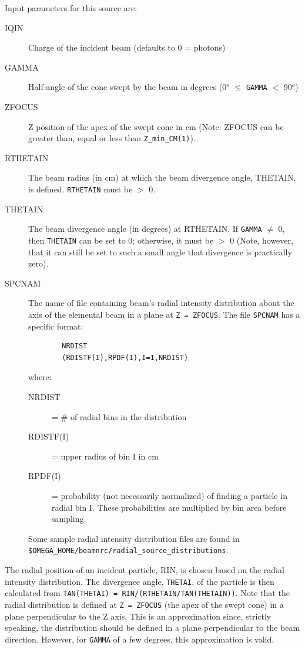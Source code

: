 \documentclass[12pt,twoside]{article}
\begin{document}
Input parameters for this source are:
\vspace{-3mm}
\begin{description}
\item [IQIN] Charge of the incident beam (defaults to 0 = photons)
\item [GAMMA] Half-angle of the cone swept by the beam in degrees (0$^o$ $\leq$
\verb+GAMMA+ $<$ 90$^o$)
\item [ZFOCUS] Z position of the apex of the swept cone in cm (Note: ZFOCUS can
be greater than, equal or less than {\tt Z\_min\_CM(1)}).
\item [RTHETAIN] The beam radius (in cm)
at which the beam divergence angle, THETAIN, is
defined. {\tt RTHETAIN} must be $>$ 0.
\item [THETAIN] The beam divergence angle (in degrees) at RTHETAIN.  If
{\tt GAMMA} $\neq$ 0, then {\tt THETAIN} can be set to 0; otherwise, it
must be $>$ 0 (Note, however, that it can still be set to such a small
angle that divergence is practically zero).
\item [SPCNAM] The name of file containing beam's radial intensity
distribution about the axis of the elemental beam in a plane at {\tt Z =
ZFOCUS}.
The file \verb+SPCNAM+ has a specific format:
\vspace{-5mm}
\begin{verbatim}
        NRDIST
        (RDISTF(I),RPDF(I),I=1,NRDIST)
\end{verbatim}
\vspace{-5mm}
where:
\begin{description}
\item [NRDIST] = \# of radial bins in the distribution
\item [RDISTF(I)] = upper radius of bin I in cm
\item [RPDF(I)] = probability (not necessarily normalized) of finding a
                  particle in radial bin I.  These probabilities are multiplied
                  by bin area before sampling.
\end{description}
Some sample radial intensity distribution files are found in {\tt \$OMEGA\_HOME/beamnrc/radial\_source\_distributions}.
\end{description}
The radial position of an incident particle, RIN, is chosen based on
the radial intensity distribution.  The divergence angle, {\tt THETAI}, of the
particle is then
calculated from {\tt TAN(THETAI) = RIN/(RTHETAIN/TAN(THETAIN))}.
Note that the radial distribution is defined at {\tt Z = ZFOCUS} (the apex of the swept
cone) in a plane perpendicular to the Z axis.  This is an approximation since,
strictly speaking, the distribution should be defined in a plane perpendicular
to the beam direction.  However, for {\tt GAMMA} of a
few degrees, this approximation is valid.
\end{document}

